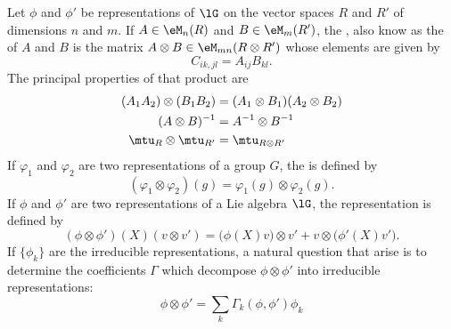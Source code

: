 Let $\phi$ and $\phi'$ be representations of $\lG$ on the vector spaces $R$ and $R'$ of dimensions $n$ and $m$. If $A\in\eM_n(R)$ and $B\in\eM_m(R')$, the , also know as the  of $A$ and $B$ is the matrix $A\otimes B\in\eM_{mn}(R\otimes R')$ whose elements are given by
\begin{equation}
    C_{ik,jl}=A_{ij}B_{kl}.
\end{equation}
The principal properties of that product are
\begin{subequations}
    \begin{align}
        (A_1A_2)\otimes(B_1B_2)&=(A_1\otimes B_1)(A_2\otimes B_2)\\
        (A\otimes B)^{-1}   &= A^{-1}\otimes B^{-1}\\
        \mtu_{R}\otimes\mtu_{R'}&=\mtu_{R\otimes R'}
    \end{align}
\end{subequations}
If $\varphi_1$ and $\varphi_2$ are two representations of a group $G$, the  is defined by
\begin{equation}
    (\varphi_1\otimes\varphi_2)(g)=\varphi_1(g)\otimes\varphi_2(g).
\end{equation}
If $\phi$ and $\phi'$ are two representations of a Lie algebra $\lG$, the  representation is defined by
\begin{equation}
    (\phi\otimes\phi')(X)(v\otimes v')=\big( \phi(X)v\big)\otimes v'+v\otimes\big( \phi'(X)v' \big).
\end{equation}
If $\{ \phi_k \}$ are the irreducible representations, a natural question that arise is to determine the coefficients $\Gamma$ which decompose $\phi\otimes\phi'$ into irreducible representations:
\begin{equation}
    \phi\otimes\phi'=\sum_k\Gamma_k(\phi,\phi')\phi_k
\end{equation}


